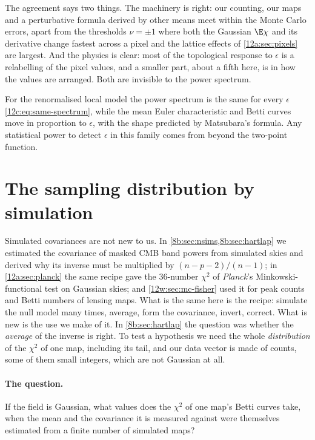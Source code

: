 The agreement says two things. The machinery is right: our counting, our maps and a perturbative formula derived by
other means meet within the Monte Carlo errors, apart from the thresholds $\nu=\pm1$ where both the Gaussian $\E\chi$
and its derivative change fastest across a pixel and the lattice effects of \cref{12a:sec:pixels} are largest. And the
physics is clear: most of the topological response to $\epsilon$ is a relabelling of the pixel values, and a smaller part,
about a fifth here, is in how the values are arranged. Both are invisible to the power spectrum.

\begin{keyidea}
For the renormalised local model the power spectrum is the same for every $\epsilon$ \eqref{12c:eq:same-spectrum}, while the
mean Euler characteristic and Betti curves move in proportion to $\epsilon$, with the shape predicted by Matsubara's
formula. Any statistical power to detect $\epsilon$ in this family comes from beyond the two-point function.
\end{keyidea}
\section{The sampling distribution by simulation}
\label{12c:sec:mc}

Simulated covariances are not new to us. In \cref{8b:sec:nsims,8b:sec:hartlap} we estimated the covariance of masked
CMB band powers from simulated skies and derived why its inverse must be multiplied by $(n-p-2)/(n-1)$; in
\cref{12a:sec:planck} the same recipe gave the $36$-number $\chi^2$ of \textit{Planck}'s Minkowski-functional test on
Gaussian skies; and \cref{12w:sec:mc-fisher} used it for peak counts and Betti numbers of lensing maps. What is the same
here is the recipe: simulate the null model many times, average, form the covariance, invert, correct. What is new is the
use we make of it. In \cref{8b:sec:hartlap} the question was whether the \emph{average} of the inverse is right. To test a
hypothesis we need the whole \emph{distribution} of the $\chi^2$ of one map, including its tail, and our data vector is
made of counts, some of them small integers, which are not Gaussian at all.

\paragraph{The question.} If the field is Gaussian, what values does the $\chi^2$ of one map's Betti curves take, when
the mean and the covariance it is measured against were themselves estimated from a finite number of simulated maps?

